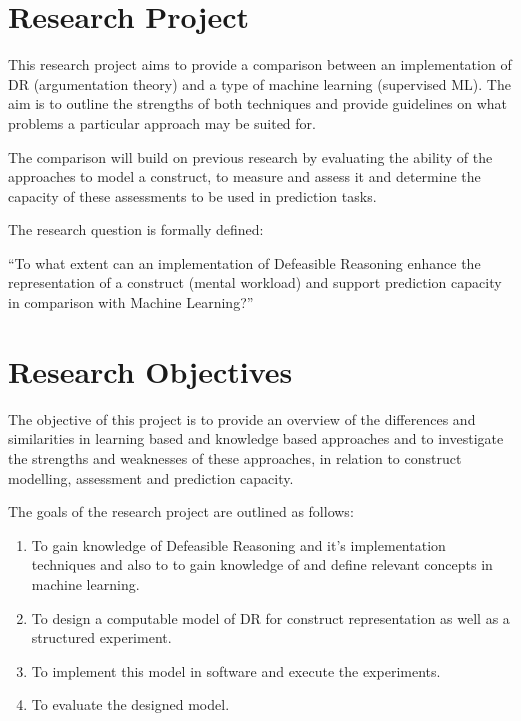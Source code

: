 
\section{Research Project}


This research project aims to provide a comparison between an implementation of DR (argumentation theory) and a type of machine learning (supervised ML). The aim is to outline the strengths of both techniques and provide guidelines on what problems a particular approach may be suited for. 

The comparison will build on previous research by evaluating the ability of the approaches to model a construct, to measure and assess it and determine the capacity of these assessments to be used in prediction tasks. 

The research question is formally defined:

``To what extent can an implementation of Defeasible Reasoning enhance the representation of a construct (mental workload) and support prediction capacity in comparison with Machine Learning?''



\section{Research Objectives}

The objective of this project is to provide an overview of the differences and similarities in learning based and knowledge based approaches and to investigate the strengths and weaknesses of these approaches, in relation to construct modelling, assessment and prediction capacity.

The goals of the research project are outlined as follows:

\begin{enumerate}
  \item To gain knowledge of Defeasible Reasoning and it's implementation techniques and also to to gain knowledge of and define relevant concepts in machine learning.
  \item To design a computable model of DR for construct representation as well as a structured experiment.
  \item To implement this model in software and execute the experiments.
  \item To evaluate the designed model.
\end{enumerate}

